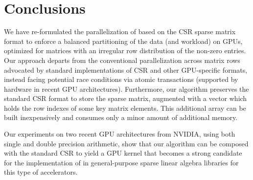 \section{Conclusions}
\label{sec:conclusion}

We have re-formulated the parallelization of \spmv
based on the CSR sparse matrix format
to enforce a balanced partitioning of the data (and workload) on GPUs,
optimized for matrices with an irregular row distribution
of the non-zero entries.
Our approach departs from the conventional parallelization across matrix rows
advocated by standard implementations of CSR \spmv
and other GPU-specific formats,
instead facing potential race conditions via atomic transactions
(supported by hardware in recent GPU architectures).
Furthermore,
our algorithm preserves the standard CSR format to store the sparse matrix,
augmented with a vector
which holds the row indexes of some key matrix elements. This 
additional array
can be built inexpensively and consumes only a minor amount of additional memory.

Our experiments on two recent GPU architectures from NVIDIA,
using both single and double precision arithmetic,
show that our algorithm can be composed with the standard CSR \spmv
to yield a GPU kernel that becomes a strong candidate
for the implementation of \spmv
in general-purpose sparse linear algebra libraries
for this type of accelerators.

